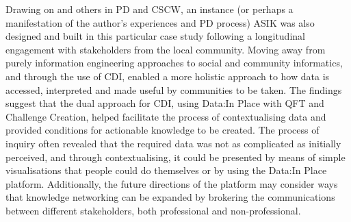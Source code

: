 Drawing on \citet{hakken_social_2003} and others in PD and CSCW, an instance (or perhaps a manifestation of the author's experiences and PD process) ASIK was also designed and built in this particular case study following a longitudinal engagement with stakeholders from the local community. Moving away from purely information engineering approaches to social and community informatics, and through the use of CDI, enabled a more holistic approach to how data is accessed, interpreted and made useful by communities to be taken. The findings suggest that the dual approach for CDI, using Data:In Place with QFT and Challenge Creation, helped facilitate the process of contextualising data and provided conditions for actionable knowledge to be created. The process of inquiry often revealed that the required data was not as complicated as initially perceived, and through contextualising, it could be presented by means of simple visualisations that people could do themselves or by using the Data:In Place platform. Additionally, the future directions of the platform may consider ways that knowledge networking can be expanded by brokering the communications between different stakeholders, both professional and non-professional.

